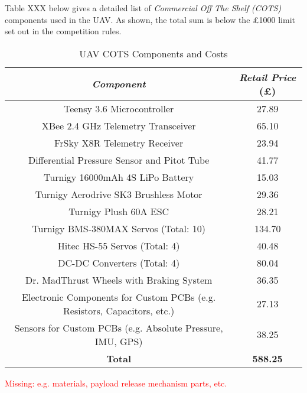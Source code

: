 Table XXX below gives a detailed list of \textit{Commercial Off The Shelf (COTS)} components used in the UAV. As shown, the total sum is below the \pounds 1000 limit set out in the competition rules.

\begin{table}[h]
 \centering
 \begin{tabular}{||c | c||} 
 \hline
 \textit{Component} & \textit{Retail Price} (\pounds) \\ [0.5ex] 
 \hline\hline
 Teensy 3.6 Microcontroller & 27.89 \\ 
 \hline
 XBee 2.4 GHz Telemetry Transceiver & 65.10 \\
 \hline
 FrSky X8R Telemetry Receiver & 23.94 \\
 \hline
 Differential Pressure Sensor and Pitot Tube & 41.77 \\
 \hline
 Turnigy 16000mAh 4S LiPo Battery & 15.03 \\
 \hline
 Turnigy Aerodrive SK3 Brushless Motor & 29.36 \\
 \hline
 Turnigy Plush 60A ESC & 28.21 \\
 \hline
 Turnigy BMS-380MAX Servos (Total: 10) & 134.70 \\
 \hline
 Hitec HS-55 Servos (Total: 4) & 40.48 \\
 \hline
 DC-DC Converters (Total: 4) & 80.04 \\
 \hline
 Dr. MadThrust Wheels with Braking System & 36.35 \\
 \hline
 Electronic Components for Custom PCBs (e.g. Resistors, Capacitors, etc.) & 27.13 \\
 \hline
 Sensors for Custom PCBs (e.g. Absolute Pressure, IMU, GPS) & 38.25 \\
 \hline \hline
 \textbf{Total} & \textbf{588.25} \\
 \hline
\end{tabular}
\caption{UAV COTS Components and Costs}
\end{table}

\textcolor{red}{Missing: e.g. materials, payload release mechanism parts, etc.}
